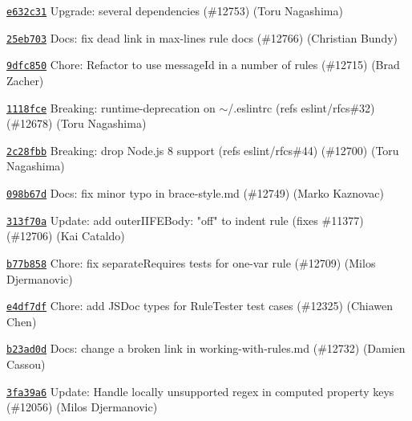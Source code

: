 \begin{DoxyItemize}
\item \href{https://github.com/eslint/eslint/commit/e632c31d7e5363f1347b787702ecd4a85f5c11a2}{\texttt{ {\ttfamily e632c31}}} Upgrade\+: several dependencies (\#12753) (Toru Nagashima)
\item \href{https://github.com/eslint/eslint/commit/25eb703c8758563988ffb497a53f89a3ed345399}{\texttt{ {\ttfamily 25eb703}}} Docs\+: fix dead link in max-\/lines rule docs (\#12766) (Christian Bundy)
\item \href{https://github.com/eslint/eslint/commit/9dfc8501fb1956c90dc11e6377b4cb38a6bea65d}{\texttt{ {\ttfamily 9dfc850}}} Chore\+: Refactor to use message\+Id in a number of rules (\#12715) (Brad Zacher)
\item \href{https://github.com/eslint/eslint/commit/1118fceb49af3436b8dcd0c6089f913cedf9a329}{\texttt{ {\ttfamily 1118fce}}} Breaking\+: runtime-\/deprecation on \textquotesingle{}\texorpdfstring{$\sim$}{\string~}/.eslintrc\textquotesingle{} (refs eslint/rfcs\#32) (\#12678) (Toru Nagashima)
\item \href{https://github.com/eslint/eslint/commit/2c28fbbb563a44282bef0c9fcc9be29d611cc83b}{\texttt{ {\ttfamily 2c28fbb}}} Breaking\+: drop Node.\+js 8 support (refs eslint/rfcs\#44) (\#12700) (Toru Nagashima)
\item \href{https://github.com/eslint/eslint/commit/098b67d04a4b4dc8ef4faa6434c6ef5abbde3ed3}{\texttt{ {\ttfamily 098b67d}}} Docs\+: fix minor typo in brace-\/style.\+md (\#12749) (Marko Kaznovac)
\item \href{https://github.com/eslint/eslint/commit/313f70ac9a3cf5d1558d2427b00dd75666e18cf4}{\texttt{ {\ttfamily 313f70a}}} Update\+: add outer\+IIFEBody\+: "{}off"{} to indent rule (fixes \#11377) (\#12706) (Kai Cataldo)
\item \href{https://github.com/eslint/eslint/commit/b77b8585e33fc4bb438a0e11ca8177c7eb91dbd8}{\texttt{ {\ttfamily b77b858}}} Chore\+: fix separate\+Requires tests for one-\/var rule (\#12709) (Milos Djermanovic)
\item \href{https://github.com/eslint/eslint/commit/e4df7dfb0199badb61d2c03ff4f7e4be735279d9}{\texttt{ {\ttfamily e4df7df}}} Chore\+: add JSDoc types for Rule\+Tester test cases (\#12325) (Chiawen Chen)
\item \href{https://github.com/eslint/eslint/commit/b23ad0d789a909baf8d7c41a35bc53df932eaf30}{\texttt{ {\ttfamily b23ad0d}}} Docs\+: change a broken link in working-\/with-\/rules.\+md (\#12732) (Damien Cassou)
\item \href{https://github.com/eslint/eslint/commit/3fa39a633b37544fec7cedfc1f2b0e62e9312a72}{\texttt{ {\ttfamily 3fa39a6}}} Update\+: Handle locally unsupported regex in computed property keys (\#12056) (Milos Djermanovic)

\end{DoxyItemize}
